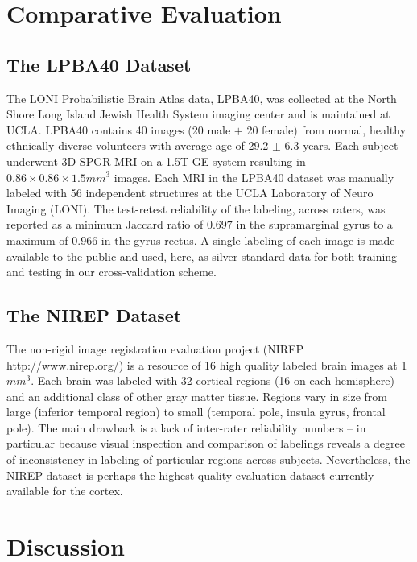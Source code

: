 \documentclass[11pt,english]{article}
\begin{document}
\section{Comparative Evaluation}

{\color{red}{\em Brian, John}}

\subsection{The LPBA40 Dataset}  
\label{sec:lpba}
The LONI Probabilistic Brain Atlas data, LPBA40, \citep{Shattuck2008} was collected at the North Shore Long
Island Jewish Health System imaging center and is maintained at UCLA.
LPBA40 contains 40 images (20 male $+$ 20 female) from normal, healthy
ethnically diverse volunteers with average age of 29.2 $\pm$ 6.3
years.  Each subject underwent 3D SPGR MRI on a 1.5T GE system
resulting in $0.86 \times 0.86 \times 1.5 mm^3$ images.  Each MRI in
the LPBA40 dataset was manually labeled with 56 independent structures
at the UCLA Laboratory of Neuro Imaging (LONI).  The test-retest
reliability of the labeling, across raters, was reported as a minimum
Jaccard ratio of $0.697$ in the supramarginal gyrus to a maximum of
$0.966$ in the gyrus rectus.  A single labeling of each image is made
available to the public and used, here, as silver-standard data 
for both training and testing in our cross-validation scheme. 

\subsection{The NIREP Dataset}  
The non-rigid image registration evaluation project (NIREP
http://www.nirep.org/) is a resource of 16 high quality labeled brain
images at 1$mm^3$.  Each brain was labeled with 32 cortical regions
(16 on each hemisphere) and an additional class of other gray matter
tissue.  Regions vary in size from large (inferior temporal region) to
small (temporal pole, insula gyrus, frontal pole).  The main drawback
is a lack of inter-rater reliability numbers -- in particular because
visual inspection and comparison of labelings reveals a degree of
inconsistency in labeling of particular regions across subjects.
Nevertheless, the NIREP dataset is perhaps the highest quality
evaluation dataset currently available for the cortex. 

\section{Discussion}
\end{document}
